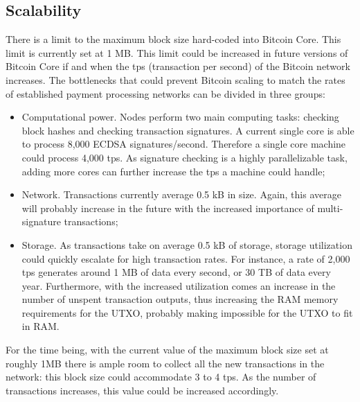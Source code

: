 \documentclass{article}
\begin{document}
\subsection*{Scalability}
There is a limit to the maximum block size hard-coded into Bitcoin Core. This limit is currently set at 1 MB. This limit could be increased in future versions of Bitcoin Core if and when the tps (transaction per second) of the Bitcoin network increases. The bottlenecks that could prevent Bitcoin scaling to match the rates of established payment processing networks can be divided in three groups:
\begin{itemize}
    \item Computational power. Nodes perform two main computing tasks: checking block hashes and checking transaction signatures. A current single core is able to process 8,000 ECDSA signatures/second. Therefore a single core machine could process 4,000 tps. As signature checking is a highly parallelizable task, adding more cores can further increase the tps a machine could handle;
    \item Network. Transactions currently average 0.5 kB in size. Again, this average will probably increase in the future with the increased importance of multi-signature transactions;
    \item Storage. As transactions take on average 0.5 kB of storage, storage utilization could quickly escalate for high transaction rates. For instance, a rate of 2,000 tps generates around 1 MB of data every second, or 30 TB of data every year. Furthermore, with the increased utilization comes an increase in the number of unspent transaction outputs, thus increasing the RAM memory requirements for the UTXO, probably making impossible for the UTXO to fit in RAM.
\end{itemize}
For the time being, with the current value of the maximum block size set at roughly 1MB there is ample room to collect all the new transactions in the network: this block size could accommodate 3 to 4 tps. As the number of transactions increases, this value could be increased accordingly.
\end{document}
